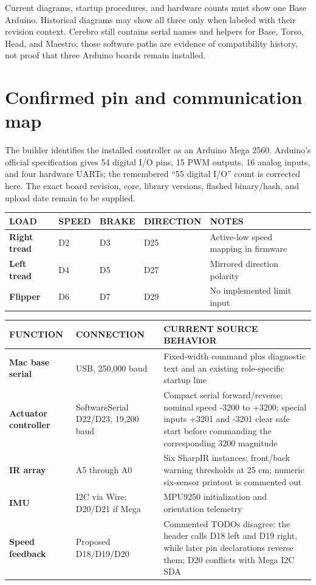 \documentclass[10pt,openany]{book}
\begin{document}
Current diagrams, startup procedures, and hardware counts must show one Base Arduino. Historical diagrams may show all three only when labeled with their revision context. Cerebro still contains serial names and helpers for Base, Torso, Head, and Maestro; those software paths are evidence of compatibility history, not proof that three Arduino boards remain installed.

\section{Confirmed pin and communication map}

The builder identifies the installed controller as an Arduino Mega 2560. Arduino's official specification gives 54 digital I/O pins, 15 PWM outputs, 16 analog inputs, and four hardware UARTs; the remembered ``55 digital I/O'' count is corrected here. The exact board revision, core, library versions, flashed binary/hash, and upload date remain to be supplied.

\ROBArduinoWiringDiagram

\begin{tabularx}{\textwidth}{>{\robcondensed\bfseries}p{1.38in} >{\centering\arraybackslash}p{0.7in} >{\centering\arraybackslash}p{0.7in} >{\centering\arraybackslash}p{0.78in} X}
\toprule
LOAD & SPEED & BRAKE & DIRECTION & NOTES\\
\midrule
Right tread & D2 & D3 & D25 & Active-low speed mapping in firmware\\
Left tread & D4 & D5 & D27 & Mirrored direction polarity\\
Flipper & D6 & D7 & D29 & No implemented limit input\\
\bottomrule
\end{tabularx}

\begin{tabularx}{\textwidth}{>{\robcondensed\bfseries}p{1.55in} p{1.2in} X}
\toprule
FUNCTION & CONNECTION & CURRENT SOURCE BEHAVIOR\\
\midrule
Mac base serial & USB, 250,000 baud & Fixed-width command plus diagnostic text and an existing role-specific startup line\\
Actuator controller & SoftwareSerial D22/D23, 19,200 baud & Compact serial forward/reverse; nominal speed -3200 to +3200; special inputs +3201 and -3201 clear safe start before commanding the corresponding 3200 magnitude\\
IR array & A5 through A0 & Six SharpIR instances; front/back warning thresholds at 25 cm; numeric six-sensor printout is commented out\\
IMU & I2C via Wire; D20/D21 if Mega & MPU9250 initialization and orientation telemetry\\
Speed feedback & Proposed D18/D19/D20 & Commented TODOs disagree: the header calls D18 left and D19 right, while later pin declarations reverse them; D20 conflicts with Mega I2C SDA\\
\bottomrule
\end{tabularx}
\end{document}
